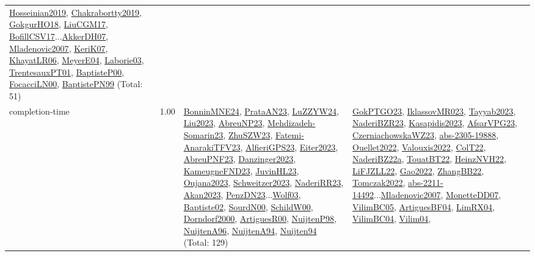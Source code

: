{\begin{longtable}{p{3cm}r>{\raggedright\arraybackslash}p{6cm}>{\raggedright\arraybackslash}p{6cm}>{\raggedright\arraybackslash}p{8cm}}
\hyperref[detail:Hosseinian2019]{Hosseinian2019}, \hyperref[detail:Chakrabortty2019]{Chakrabortty2019}, \hyperref[detail:GokgurHO18]{GokgurHO18}, \hyperref[detail:LiuCGM17]{LiuCGM17}, \hyperref[detail:BofillCSV17]{BofillCSV17}...\hyperref[detail:AkkerDH07]{AkkerDH07}, \hyperref[detail:Mladenovic2007]{Mladenovic2007}, \hyperref[detail:KeriK07]{KeriK07}, \hyperref[detail:KhayatLR06]{KhayatLR06}, \hyperref[detail:MeyerE04]{MeyerE04}, \hyperref[detail:Laborie03]{Laborie03}, \hyperref[detail:TrentesauxPT01]{TrentesauxPT01}, \hyperref[detail:BaptisteP00]{BaptisteP00}, \hyperref[detail:FocacciLN00]{FocacciLN00}, \hyperref[detail:BaptistePN99]{BaptistePN99} (Total: 51)\\
\index{completion-time}\index{Concepts!completion-time}completion-time &  1.00 & \hyperref[detail:BonninMNE24]{BonninMNE24}, \hyperref[detail:PrataAN23]{PrataAN23}, \hyperref[detail:LuZZYW24]{LuZZYW24}, \hyperref[detail:Liu2023]{Liu2023}, \hyperref[detail:AbreuNP23]{AbreuNP23}, \hyperref[detail:Mehdizadeh-Somarin23]{Mehdizadeh-Somarin23}, \hyperref[detail:ZhuSZW23]{ZhuSZW23}, \hyperref[detail:Fatemi-AnarakiTFV23]{Fatemi-AnarakiTFV23}, \hyperref[detail:AlfieriGPS23]{AlfieriGPS23}, \hyperref[detail:Eiter2023]{Eiter2023}, \hyperref[detail:AbreuPNF23]{AbreuPNF23}, \hyperref[detail:Danzinger2023]{Danzinger2023}, \hyperref[detail:KameugneFND23]{KameugneFND23}, \hyperref[detail:JuvinHL23]{JuvinHL23}, \hyperref[detail:Oujana2023]{Oujana2023}, \hyperref[detail:Schweitzer2023]{Schweitzer2023}, \hyperref[detail:NaderiRR23]{NaderiRR23}, \hyperref[detail:Akan2023]{Akan2023}, \hyperref[detail:PenzDN23]{PenzDN23}...\hyperref[detail:Wolf03]{Wolf03}, \hyperref[detail:Baptiste02]{Baptiste02}, \hyperref[detail:SourdN00]{SourdN00}, \hyperref[detail:SchildW00]{SchildW00}, \hyperref[detail:Dorndorf2000]{Dorndorf2000}, \hyperref[detail:ArtiguesR00]{ArtiguesR00}, \hyperref[detail:NuijtenP98]{NuijtenP98}, \hyperref[detail:NuijtenA96]{NuijtenA96}, \hyperref[detail:NuijtenA94]{NuijtenA94}, \hyperref[detail:Nuijten94]{Nuijten94} (Total: 129) & \hyperref[detail:GokPTGO23]{GokPTGO23}, \hyperref[detail:IklassovMR023]{IklassovMR023}, \hyperref[detail:Tayyab2023]{Tayyab2023}, \hyperref[detail:NaderiBZR23]{NaderiBZR23}, \hyperref[detail:Kasapidis2023]{Kasapidis2023}, \hyperref[detail:AfsarVPG23]{AfsarVPG23}, \hyperref[detail:CzerniachowskaWZ23]{CzerniachowskaWZ23}, \hyperref[detail:abs-2305-19888]{abs-2305-19888}, \hyperref[detail:Ouellet2022]{Ouellet2022}, \hyperref[detail:Valouxis2022]{Valouxis2022}, \hyperref[detail:ColT22]{ColT22}, \hyperref[detail:NaderiBZ22a]{NaderiBZ22a}, \hyperref[detail:TouatBT22]{TouatBT22}, \hyperref[detail:HeinzNVH22]{HeinzNVH22}, \hyperref[detail:LiFJZLL22]{LiFJZLL22}, \hyperref[detail:Gao2022]{Gao2022}, \hyperref[detail:ZhangBB22]{ZhangBB22}, \hyperref[detail:Tomczak2022]{Tomczak2022}, \hyperref[detail:abs-2211-14492]{abs-2211-14492}...\hyperref[detail:Mladenovic2007]{Mladenovic2007}, \hyperref[detail:MonetteDD07]{MonetteDD07}, \hyperref[detail:VilimBC05]{VilimBC05}, \hyperref[detail:ArtiguesBF04]{ArtiguesBF04}, \hyperref[detail:LimRX04]{LimRX04}, \hyperref[detail:VilimBC04]{VilimBC04}, \hyperref[detail:Vilim04]{Vilim04}, 
\end{longtable}}
